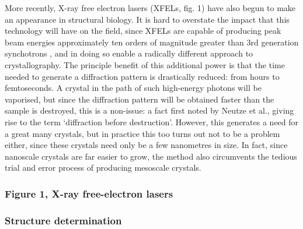 \documentclass[a4paper,11pt,twoside,openright]{scrbook}
\let\cite\supercite
\begin{document}
More recently, X-ray free electron lasers (XFELs, fig. 1) have also begun to make an appearance in structural biology. It is hard to overstate the impact that this technology will have on the field, since XFELs are capable of producing peak beam energies approximately ten orders of magnitude greater than 3rd generation synchotrons \cite{Shi2014}, and in doing so enable a radically different approach to crystallography. The principle benefit of this additional power is that the time needed to generate a diffraction pattern is drastically reduced: from hours to femtoseconds. A crystal in the path of such high-energy photons will be vaporised, but since the diffraction pattern will be obtained faster than the sample is destroyed, this is a non-issue: a fact first noted by Neutze et al.\cite{Neutze2000}, giving rise to the term `diffraction before destruction'. However, this generates a need for a great many crystals, but in practice this too turns out not to be a problem either, since these crystals need only be a few nanometres in size. In fact, since nanoscale crystals are far easier to grow, the method also circumvents the tedious trial and error process of producing mesoscale crystals.

\subsubsection{Figure 1, X-ray free-electron lasers}

\subsubsection{Structure determination}
\end{document}
